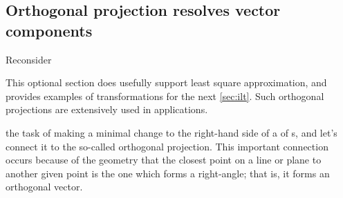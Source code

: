 %





\subsection{Orthogonal projection resolves vector components}
\label{sec:proj}


\begin{comment}
\cite[p.738]{HughesHallett2013} \pooliv{p.27--8}
onto a vector, parallel and perpendicular components, work done
\pooliv{p.382}
orthogonal projections onto subspace, orthogonal decomposition thm,
\end{comment}

Reconsider \begin{aside}
This optional section does usefully support least square approximation, and provides examples of transformations for the next \autoref{sec:ilt}.
Such orthogonal projections are extensively used in applications.
\end{aside}%
the task of making a minimal change to the right-hand side of a  of s, and let's connect it to the so-called orthogonal projection.
This important connection occurs because of the geometry that the closest point on a line or plane to another given point is the one which forms a right-angle; that is, it forms an orthogonal vector.


